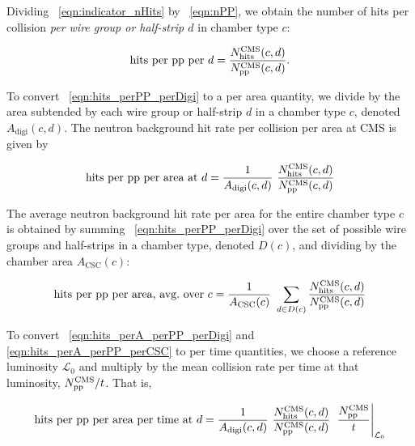 
Dividing \Eq~\ref{eqn:indicator_nHits} by \Eq~\ref{eqn:nPP}, we obtain
the number of hits per \pp collision {\em per wire group or
half-strip $d$} in chamber type $c$:

\begin{equation}
	\label{eqn:hits_perPP_perDigi}
\text{hits per \pp per $d$} = 
      \frac{N_\text{hits}^\text{CMS}(c,d)}{N_\text{\pp}^\text{CMS}(c,d)}.
\end{equation}

To convert \Eq~\ref{eqn:hits_perPP_perDigi} to a per area quantity, we divide by the area subtended by each wire group or half-strip $d$ in a chamber type $c$, denoted $A_\text{digi}(c, d)$. The neutron background hit rate per \pp collision per area at CMS is given by

\begin{equation}
	\label{eqn:hits_perA_perPP_perDigi}
\text{hits per \pp per area at $d$} = 
   \frac{1}{A_\text{digi}(c, d)}  \  \frac{N_\text{hits}^\text{CMS}(c,d)}{N_\text{\pp}^\text{CMS}(c,d)}
\end{equation}

The average neutron background hit rate per area for the entire chamber type $c$ is obtained by summing \Eq~\ref{eqn:hits_perPP_perDigi} over the set of possible wire groups and half-strips in a chamber type, denoted $D(c)$, and dividing by the chamber area $A_\text{CSC}(c)$:

\begin{equation}
	\label{eqn:hits_perA_perPP_perCSC}
\text{hits per \pp per area, avg.\ over $c$} = 
   \frac{1}{A_\text{CSC}(c)}  \  \sum_{d\in D(c)}{\frac{N_\text{hits}^\text{CMS}(c,d)}{N_\text{\pp}^\text{CMS}(c,d)}}
\end{equation}

To convert \Eqs~\ref{eqn:hits_perA_perPP_perDigi} and \ref{eqn:hits_perA_perPP_perCSC} to per time quantities, we choose a reference luminosity $\mathcal{L}_0$ and multiply by the mean \pp collision rate per time at that luminosity, $N_\text{\ensuremath{\mathrm{p}}\ensuremath{\mathrm{p}}}^\text{CMS}/t$. That is,

\begin{equation}
    \label{eqn:hits_perA_perT_perDigi}
\text{hits per \pp per area per time at $d$} =  
  \frac{1}{A_\text{digi}(c, d)}  \  \frac{N_\text{hits}^\text{CMS}(c,d)}{N_\text{\pp}^\text{CMS}(c,d)}  \  \left.\frac{N_\text{\pp}^\text{CMS}}{t}\right|_{\mathcal{L}_0}
\end{equation}

